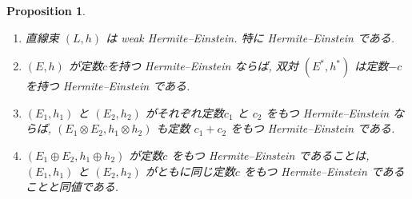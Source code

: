\documentclass[dvipdfmx,a4paper,11pt]{article} %
\newtheorem{prop}[thm]{Proposition}
\theoremstyle{definition}
\theoremstyle{remark}
\numberwithin{equation}{section}
\begin{document}
\begin{prop}
\label{prop-HE-property}
\begin{enumerate}
\item[(1)]  直線束 $(L,h)$ は weak Hermite--Einstein. 特に Hermite--Einstein である. 
\item[(2)] $(E,h)$ が定数$c$を持つ Hermite--Einstein ならば, 双対 $(E^*,h^*)$ は定数$-c$を持つ Hermite--Einstein である. 
\item[(3)] 
$(E_1,h_1)$ と $(E_2,h_2)$ がそれぞれ定数$c_1$ と $c_2$ をもつ Hermite--Einstein ならば, $(E_1\otimes E_2,h_1\otimes h_2)$ も定数 $c_1+c_2$ をもつ Hermite--Einstein である. 
\item[(4)] 
 $(E_1\oplus E_2,h_1\oplus h_2)$ が定数$c$ をもつ Hermite--Einstein であることは, $(E_1,h_1)$ と $(E_2,h_2)$ がともに同じ定数$c$ をもつ Hermite--Einstein であることと同値である. 
\end{enumerate}
\end{prop}
\end{document}

